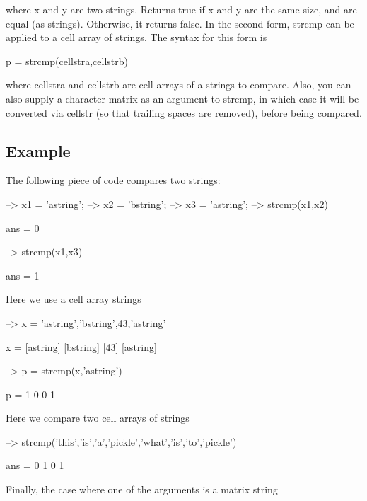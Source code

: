  where {\ttfamily x} and {\ttfamily y} are two strings. Returns {\ttfamily true} if {\ttfamily x} and {\ttfamily y} are the same size, and are equal (as strings). Otherwise, it returns {\ttfamily false}. In the second form, {\ttfamily strcmp} can be applied to a cell array of strings. The syntax for this form is \begin{DoxyVerb}  p = strcmp(cellstra,cellstrb)
\end{DoxyVerb}
 where {\ttfamily cellstra} and {\ttfamily cellstrb} are cell arrays of a strings to compare. Also, you can also supply a character matrix as an argument to {\ttfamily strcmp}, in which case it will be converted via {\ttfamily cellstr} (so that trailing spaces are removed), before being compared. \hypertarget{variables_struct_Example}{}\subsection{Example}\label{variables_struct_Example}
The following piece of code compares two strings\-:


\begin{DoxyVerbInclude}
--> x1 = 'astring';
--> x2 = 'bstring';
--> x3 = 'astring';
--> strcmp(x1,x2)

ans = 
 0 

--> strcmp(x1,x3)

ans = 
 1 
\end{DoxyVerbInclude}


Here we use a cell array strings


\begin{DoxyVerbInclude}
--> x = {'astring','bstring',43,'astring'}

x = 
 [astring] [bstring] [43] [astring] 

--> p = strcmp(x,'astring')

p = 
 1 0 0 1 
\end{DoxyVerbInclude}


Here we compare two cell arrays of strings


\begin{DoxyVerbInclude}
--> strcmp({'this','is','a','pickle'},{'what','is','to','pickle'})

ans = 
 0 1 0 1 
\end{DoxyVerbInclude}


Finally, the case where one of the arguments is a matrix string


